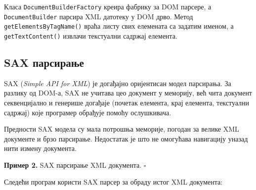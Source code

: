 Класа \texttt{DocumentBuilderFactory} креира фабрику за DOM парсере, а \texttt{DocumentBuilder} парсира XML датотеку у DOM дрво. Метод \texttt{getElementsByTagName()} враћа листу свих елемената са задатим именом, а \texttt{getTextContent()} извлачи текстуални садржај елемента.


\subsection{SAX парсирање}

SAX (\textit{Simple API for XML}) је догађајно оријентисан модел парсирања. За разлику од DOM-а, SAX не учитава цео документ у меморију, већ чита документ секвенцијално и генерише догађаје (почетак елемента, крај елемента, текстуални садржај) које програмер обрађује помоћу ослушкивача.

Предности SAX модела су мала потрошња меморије, погодан за велике XML документе и брзо парсирање. Недостатак је што не омогућава навигацију уназад нити измену документа.


\bigskip

\noindent \textbf{Пример 2.} SAX парсирање XML документа. $\square$

\medskip

Следећи програм користи SAX парсер за обраду истог XML документа:


